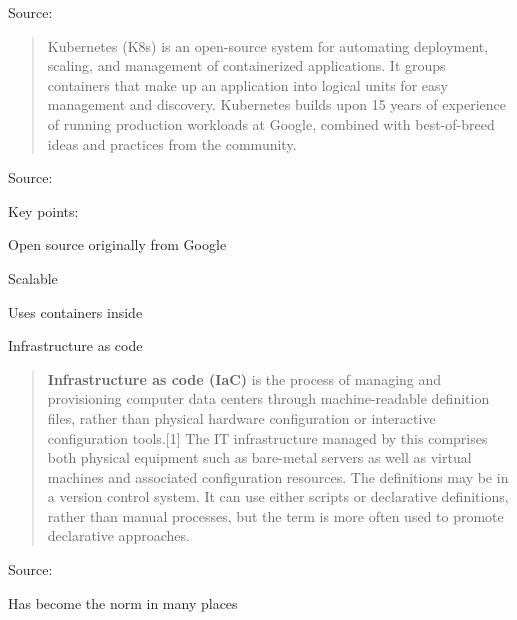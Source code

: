 \documentclass[Screen16to9,17pt]{foils}
\begin{document}
Source: {\footnotesize
{}}





\begin{quote}
  Kubernetes (K8s) is an open-source system for automating deployment, scaling, and management of containerized applications.
  It groups containers that make up an application into logical units for easy management and discovery. Kubernetes builds upon 15 years of experience of running production workloads at Google, combined with best-of-breed ideas and practices from the community.
\end{quote}
Source: {\footnotesize
{}}

Key points:
\begin{list2}
\item Open source originally from Google
\item Scalable
\item Uses containers inside
\item Infrastructure as code
\end{list2}




\begin{quote}
{\bf Infrastructure as code (IaC)} is the process of managing and provisioning computer data centers through machine-readable definition files, rather than physical hardware configuration or interactive configuration tools.[1] The IT infrastructure managed by this comprises both physical equipment such as bare-metal servers as well as virtual machines and associated configuration resources. The definitions may be in a version control system. It can use either scripts or declarative definitions, rather than manual processes, but the term is more often used to promote declarative approaches.
\end{quote}
Source: {\footnotesize
{}}

\begin{list2}
  \item Has become the norm in many places
\end{list2}



\end{document}
